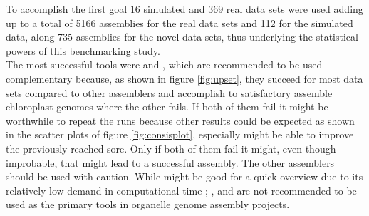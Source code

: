 To accomplish the first goal 16 simulated and 369 real data sets were used adding up to a
total of 5166 assemblies for the real data sets and 112 for the simulated data, along 735
assemblies for the novel data sets, thus underlying the statistical powers of this
benchmarking study.\\
The most successful tools were \go \hspace{.5ex} and \fp, which are recommended to be used
complementary because, as shown in figure \ref{fig:upset}, they succeed for most data sets
compared to other assemblers and accomplish to satisfactory assemble chloroplast genomes
where the other fails. If both of them fail it might be worthwhile to repeat the runs
because other results could be expected as shown in the scatter plots of figure
\ref{fig:consisplot}, especially \fp \hspace{.5ex} might be able to improve the previously
reached sore. Only if both of them fail it might, even though improbable, that \np might
lead to a successful assembly. The other assemblers should be used with caution. While \ce
\hspace{.5ex} might be good for a quick overview due to its relatively low demand in
computational time \cite{freudenthal2019landscape}; \cassp, \oa \hspace{.5ex} and \ioga
\hspace{.5ex} are not recommended to be used as the primary tools in organelle genome
assembly projects.

